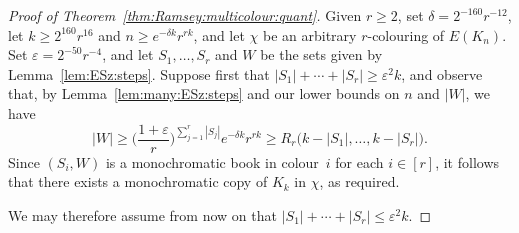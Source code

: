 \documentclass[12pt,reqno]{amsart}
\theoremstyle{definition}
\theoremstyle{remark}
\newcommand\eps{\varepsilon}
\renewcommand{\le}{\leqslant}
\renewcommand{\ge}{\geqslant}
\def\eps{\varepsilon}
\begin{document}
%
\begin{proof}[Proof of Theorem~\ref{thm:Ramsey:multicolour:quant}]
	Given \(r \ge 2\), set \(\delta = 2^{-160} r^{-12}\), let \(k \ge 2^{160} r^{16}\) and \(n \ge e^{-\delta k} r^{rk}\), and let \(\chi\) be an arbitrary \(r\)-colouring of \(E(K_n)\). Set \(\eps = 2^{-50} r^{-4}\), and let \(S_1,\ldots,S_r\) and \(W\) be the sets given by Lemma~\ref{lem:ESz:steps}. Suppose first that \(|S_1| + \cdots + |S_r| \ge \eps^2 k\), and observe that, by Lemma~\ref{lem:many:ESz:steps} and our lower bounds on \(n\) and \(|W|\), we have
	\begin{equation*}
		|W| \ge \bigg( \frac{1+\eps}{r} \bigg)^{\sum_{j = 1}^r |S_j|} e^{-\delta k} r^{rk} \ge R_r\big( k - |S_1|, \ldots, k - |S_r| \big).
	\end{equation*}
	Since \((S_i,W)\) is a monochromatic book in colour~\(i\) for each \(i \in [r]\), it follows that there exists a monochromatic copy of \(K_k\) in \(\chi\), as required.

	We may therefore assume from now on that  \(|S_1| + \cdots + |S_r| \le \eps^2 k\).


\end{proof}
\end{document}
